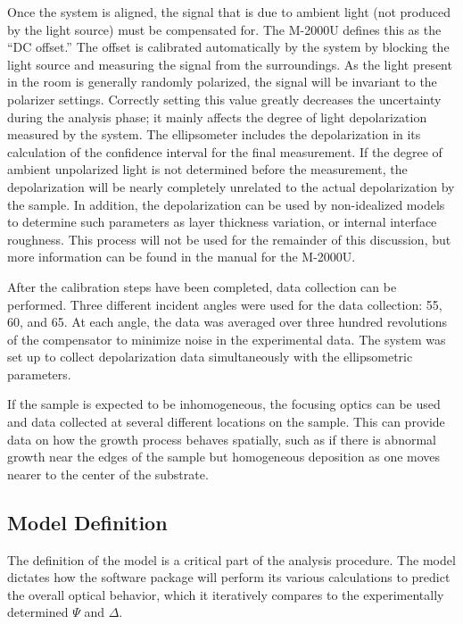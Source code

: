 Once the system is aligned, the signal that is due to ambient light (not produced by the light source) must be compensated for. The M-2000U defines this as the ``DC offset.''\cite{WVASE-manual} The offset is calibrated automatically by the system by blocking the light source and measuring the signal from the surroundings. As the light present in the room is generally randomly polarized, the signal will be invariant to the polarizer settings. Correctly setting this value greatly decreases the uncertainty during the analysis phase; it mainly affects the degree of light depolarization measured by the system. The ellipsometer includes the depolarization in its calculation of the confidence interval for the final measurement. If the degree of ambient unpolarized light is not determined before the measurement, the depolarization will be nearly completely unrelated to the actual depolarization by the sample. In addition, the depolarization can be used by non-idealized models to determine such parameters as layer thickness variation, or internal interface roughness. This process will not be used for the remainder of this discussion, but more information can be found in the manual for the M-2000U.\cite{WVASE-manual} 

After the calibration steps have been completed, data collection can be performed. Three different incident angles were used for the data collection: 55\Deg{}, 60\Deg{}, and 65\Deg{}. At each angle, the data was averaged over three hundred revolutions of the compensator to minimize noise in the experimental data. The system was set up to collect depolarization data simultaneously with the ellipsometric parameters.\cite{WVASE-manual} 

If the sample is expected to be inhomogeneous, the focusing optics can be used and data collected at several different locations on the sample. This can provide data on how the growth process behaves spatially, such as if there is abnormal growth near the edges of the sample but homogeneous deposition as one moves nearer to the center of the substrate. 


\subsection{Model Definition}

The definition of the model is a critical part of the analysis procedure. The model dictates how the software package will perform its various calculations to predict the overall optical behavior, which it iteratively compares to the experimentally determined $\Psi$ and $\Delta$. 

